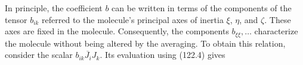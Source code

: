 In principle, the coefficient $b$ can be written in terms of the components of
the tensor $b_{ik}$ referred to the molecule's principal axes of inertia
$\xi$, $\eta$, and $\zeta$. These axes are fixed in the molecule. Consequently,
the components $b_{\xi\xi},\ldots$ characterize the molecule without being
altered by the averaging. To obtain this relation, consider the scalar
$\overline{b_{ik}J_iJ_k}$. Its evaluation using (122.4) gives
